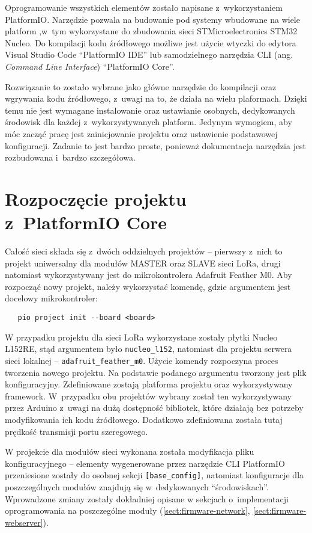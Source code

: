 Oprogramowanie wszystkich elementów zostało napisane z~wykorzystaniem PlatformIO. Narzędzie pozwala na budowanie pod
systemy wbudowane na wiele platform \cite{pio-platforms},w~tym wykorzystane do zbudowania sieci STMicroelectronics
STM32 Nucleo. Do kompilacji kodu źródłowego możliwe jest użycie wtyczki do edytora Visual Studio Code
\enquote{PlatformIO IDE} lub samodzielnego narzędzia CLI (ang. \textsl{Command Line Interface}) \enquote{PlatformIO
    Core}.

Rozwiązanie to zostało wybrane jako główne narzędzie do kompilacji oraz wgrywania kodu źródłowego, z~uwagi na to, że
działa na wielu plaformach. Dzięki temu nie jest wymagane instalowanie oraz ustawianie osobnych, dedykowanych środowisk
dla każdej z~wykorzystywanych platform. Jedynym wymogiem, aby móc zacząć pracę jest zainicjowanie projektu oraz
ustawienie podstawowej konfiguracji. Zadanie to jest bardzo proste, ponieważ dokumentacja narzędzia jest rozbudowana
i~bardzo szczegółowa.

\section{Rozpoczęcie projektu z~PlatformIO Core\label{sect:pio-intro}} Całość sieci składa się z~dwóch oddzielnych
projektów -- pierwszy z~nich to projekt uniwersalny dla modułów MASTER oraz SLAVE sieci LoRa, drugi natomiast
wykorzystywany jest do mikrokontrolera Adafruit Feather M0. Aby rozpocząć nowy projekt, należy wykorzystać komendę,
gdzie argumentem jest docelowy mikrokontroler:
\begin{verbatim}
   pio project init --board <board>
\end{verbatim}

W przypadku projektu dla sieci LoRa wykorzystane zostały płytki Nucleo L152RE, stąd argumentem było
\texttt{nucleo\_l152}, natomiast dla projektu serwera sieci lokalnej -- \texttt{adafruit\_feather\_m0}. Użycie komendy
rozpoczyna proces tworzenia nowego projektu. Na podstawie podanego argumentu tworzony jest plik konfiguracyjny.
Zdefiniowane zostają platforma projektu oraz wykorzystywany framework. W~przypadku obu projektów wybrany został ten
wykorzystywany przez Arduino z~uwagi na dużą dostępność bibliotek, które działają bez potrzeby modyfikowania ich kodu
źródłowego. Dodatkowo zdefiniowana została tutaj prędkość transmisji portu szeregowego.

W projekcie dla modułów sieci wykonana została modyfikacja pliku konfiguracyjnego -- elementy wygenerowane przez
narzędzie CLI PlatformIO przeniesione zostały do osobnej sekcji \texttt{[base\_config]}, natomiast konfiguracje dla
poszczególnych modułów znajdują się w~dedykowanych \enquote{środowiskach}. Wprowadzone zmiany zostały dokładniej opisane
w sekcjach o~implementacji oprogramowania na poszczególne moduły (\ref{sect:firmware-network},
\ref{sect:firmware-webserver}).

